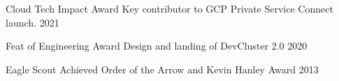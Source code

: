 

\begin{cvhonors}

  \cvhonor
    {Cloud Tech Impact Award} %
    {Key contributor to GCP Private Service Connect launch.} %
    {}
    {2021} %

  \cvhonor
    {Feat of Engineering Award} %
    {Design and landing of DevCluster 2.0} %
    {}
    {2020} %

  \cvhonor
    {Eagle Scout} %
    {Achieved Order of the Arrow and Kevin Hanley Award} %
    {}
    {2013} %

\end{cvhonors}
